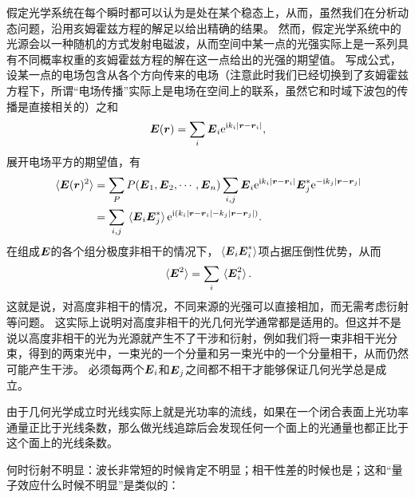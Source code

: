 假定光学系统在每个瞬时都可以认为是处在某个稳态上，从而，虽然我们在分析动态问题，沿用亥姆霍兹方程的解足以给出精确的结果。
然而，假定光学系统中的光源会以一种随机的方式发射电磁波，从而空间中某一点的光强实际上是一系列具有不同概率权重的亥姆霍兹方程的解在这一点给出的光强的期望值。
写成公式，设某一点的电场包含从各个方向传来的电场（注意此时我们已经切换到了亥姆霍兹方程下，所谓“电场传播”实际上是电场在空间上的联系，虽然它和时域下波包的传播是直接相关的）之和
\begin{equation}
    \vb*{E}(\vb*{r}) = \sum_i \vb*{E}_i \mathrm{e}^{\mathrm{i} k_i \abs*{\vb*{r} - \vb*{r}_i}},
\end{equation}
展开电场平方的期望值，有
\begin{equation}
    \begin{aligned}
        \expval*{\vb*{E}(\vb*{r})^2} &= \sum_P P(\vb*{E}_1, \vb*{E}_2, \cdots, \vb*{E}_n) \sum_{i, j} \vb*{E}_i \mathrm{e}^{\mathrm{i} k_i \abs*{\vb*{r} - \vb*{r}_i}} \vb*{E}_j^* \mathrm{e}^{- \mathrm{i} k_j \abs*{\vb*{r} - \vb*{r}_j}}  \\
        &= \sum_{i, j} \expval*{\vb*{E}_i \vb*{E}_j^*} \mathrm{e}^{\mathrm{i} (k_i \abs*{\vb*{r} - \vb*{r}_i} - k_j \abs*{\vb*{r} - \vb*{r}_j})}.
    \end{aligned}
\end{equation}
在组成$\vb*{E}$的各个组分极度非相干的情况下，$\expval*{\vb*{E}_i \vb*{E}_i^*}$项占据压倒性优势，从而
\begin{equation}
    \expval*{\vb*{E}^2} = \sum_i \expval*{\vb*{E}_i^2}.
\end{equation}
这就是说，对高度非相干的情况，不同来源的光强可以直接相加，而无需考虑衍射等问题。
这实际上说明对高度非相干的光几何光学通常都是适用的。但这并不是说以高度非相干的光为光源就产生不了干涉和衍射，例如我们将一束非相干光分束，得到的两束光中，一束光的一个分量和另一束光中的一个分量相干，从而仍然可能产生干涉。
必须每两个$\vb*{E}_i$和$\vb*{E}_j$之间都不相干才能够保证几何光学总是成立。

由于几何光学成立时光线实际上就是光功率的流线，如果在一个闭合表面上光功率通量正比于光线条数，那么做光线追踪后会发现任何一个面上的光通量也都正比于这个面上的光线条数。

何时衍射不明显：波长非常短的时候肯定不明显；相干性差的时候也是；这和“量子效应什么时候不明显”是类似的：